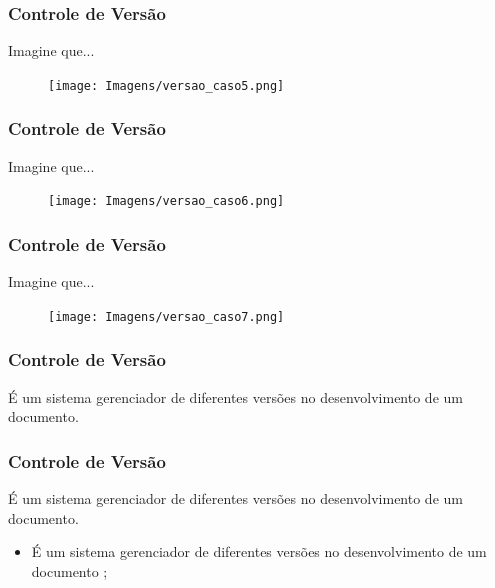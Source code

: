 \documentclass[10pt]{beamer} %
\begin{document}
\begin{frame}
\frametitle{Controle de Versão}


\begin{block}{Imagine que...}
\begin{figure}[H]
\centering
\texttt{[image: Imagens/versao\_caso5.png]}
\end{figure}

\end{block}
\end{frame}

\begin{frame}
\frametitle{Controle de Versão}


\begin{block}{Imagine que...}
\begin{figure}[H]
\centering
\texttt{[image: Imagens/versao\_caso6.png]}
\end{figure}

\end{block}
\end{frame}

\begin{frame}
\frametitle{Controle de Versão}

\begin{block}{Imagine que...}
\begin{figure}[H]
\centering
\texttt{[image: Imagens/versao\_caso7.png]}
\end{figure}

\end{block}
\end{frame}


\begin{frame}
	\frametitle{Controle de Versão}
	\begin{block}{É um sistema gerenciador de diferentes versões no desenvolvimento de um documento.}
	\end{block}
	
\end{frame}


\begin{frame}
	\frametitle{Controle de Versão}
	\begin{block}{É um sistema gerenciador de diferentes versões no desenvolvimento de um documento.}
		\begin{itemize}
			\pause
			\item É um sistema gerenciador de diferentes versões no desenvolvimento de um documento ;
			\pause 	
		\end{itemize}	
	\end{block}
	
\end{frame}
\end{document}
